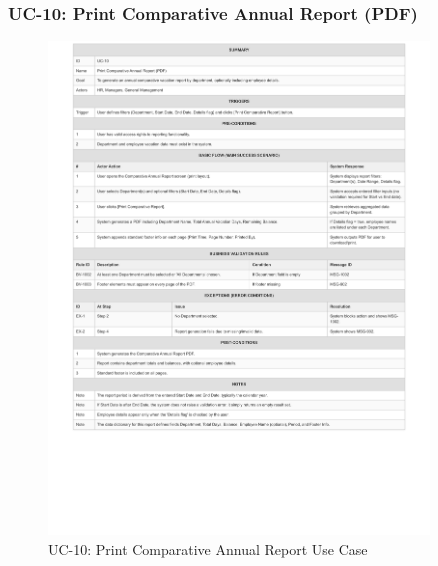\documentclass[12pt,a4paper]{article}
\begin{document}
\subsubsection{UC-10: Print Comparative Annual Report (PDF)}
\begin{figure}[H]
\centering
\includegraphics[width=0.9\textwidth]{Use-Cases/UC-10-Print-Comparative-Annual-Report/UC-10-Print-Comparative-Annual-Report-1.png}
\caption{UC-10: Print Comparative Annual Report Use Case}
\label{fig:uc10}
\end{figure}
\end{document}
